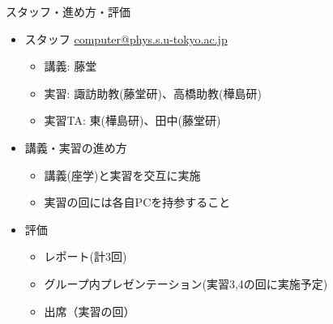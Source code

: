 \begin{frame}[t,fragile]{スタッフ・進め方・評価}
  \begin{itemize}
  \item スタッフ \href{mailto:computer@.phys.s.u-tokyo.ac.jp}{computer@phys.s.u-tokyo.ac.jp}
    \begin{itemize}
    \item 講義: 藤堂
    \item 実習: 諏訪助教(藤堂研)、高橋助教(樺島研)
    \item 実習TA: 東(樺島研)、田中(藤堂研)
    \end{itemize}
  \item 講義・実習の進め方
    \begin{itemize}
    \item 講義(座学)と実習を交互に実施
    \item 実習の回には各自PCを持参すること
    \end{itemize}
  \item 評価
    \begin{itemize}
    \item レポート(計3回)
    \item グループ内プレゼンテーション(実習3,4の回に実施予定)
    \item 出席（実習の回）
    \end{itemize}    
  \end{itemize}    
\end{frame}

